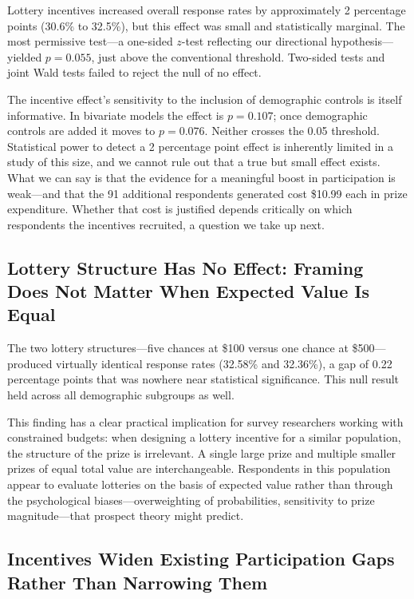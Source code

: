 Lottery incentives increased overall response rates by approximately 2 percentage points
(30.6\% to 32.5\%), but this effect was small and statistically marginal. The most
permissive test---a one-sided $z$-test reflecting our directional hypothesis---yielded
$p = 0.055$, just above the conventional threshold. Two-sided tests and joint Wald tests
failed to reject the null of no effect.

The incentive effect's sensitivity to the inclusion of demographic controls is itself
informative. In bivariate models the effect is $p = 0.107$; once demographic controls are
added it moves to $p = 0.076$. Neither crosses the 0.05 threshold. Statistical power to
detect a 2 percentage point effect is inherently limited in a study of this size, and we
cannot rule out that a true but small effect exists. What we can say is that the evidence
for a meaningful boost in participation is weak---and that the 91 additional respondents
generated cost \$10.99 each in prize expenditure. Whether that cost is justified depends
critically on which respondents the incentives recruited, a question we take up next.

\subsection{Lottery Structure Has No Effect: Framing Does Not Matter When Expected Value
  Is Equal}

The two lottery structures---five chances at \$100 versus one chance at \$500---produced
virtually identical response rates (32.58\% and 32.36\%), a gap of 0.22 percentage
points that was nowhere near statistical significance. This null result held across all
demographic subgroups as well.

This finding has a clear practical implication for survey researchers working with
constrained budgets: when designing a lottery incentive for a similar population, the
structure of the prize is irrelevant. A single large prize and multiple smaller prizes of
equal total value are interchangeable. Respondents in this population appear to evaluate
lotteries on the basis of expected value rather than through the psychological
biases---overweighting of probabilities, sensitivity to prize magnitude---that prospect
theory might predict.

\subsection{Incentives Widen Existing Participation Gaps Rather Than Narrowing Them}

